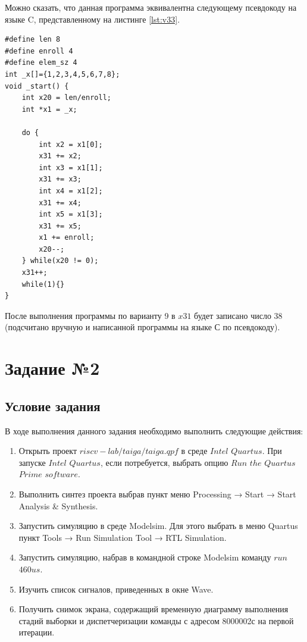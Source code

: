 \clearpage
Можно сказать, что данная программа эквивалентна следующему псевдокоду на языке C, представленному на листинге \ref{lst:v33}.

\begin{lstlisting}[label=lst:v33,caption=Псевдокод программы 9 варианта]
#define len 8
#define enroll 4
#define elem_sz 4
int _x[]={1,2,3,4,5,6,7,8};
void _start() {
	int x20 = len/enroll;
	int *x1 = _x;
	
	do {
		int x2 = x1[0];
		x31 += x2;
		int x3 = x1[1];
		x31 += x3;
		int x4 = x1[2];
		x31 += x4;
		int x5 = x1[3];
		x31 += x5;
		x1 += enroll;
		x20--;
	} while(x20 != 0);
	x31++;
	while(1){}
}
\end{lstlisting}

После выполнения программы по варианту 9 в $x31$ будет записано \newline число 38 (подсчитано вручную и написанной программы на языке С по псевдокоду).

\clearpage

\section{Задание №2}

\subsection*{Условие задания}
В ходе выполнения данного задания необходимо выполнить следующие действия:
\begin{enumerate}
	\item Открыть проект $riscv-lab/taiga/taiga.qpf$ в среде $Intel$ $Quartus$. При запуске $Intel$ $Quartus$, если потребуется, выбрать опцию $Run$ $the$ $Quartus$ $Prime$ $software$.
	\item Выполнить синтез проекта выбрав пункт меню Processing → Start → Start Analysis \& Synthesis.
	\item Запустить симуляцию в среде Modelsim. Для этого выбрать в меню Quartus пункт Tools → Run Simulation Tool → RTL Simulation.
	\item Запустить симуляцию, набрав в командной строке Modelsim команду $run$ $460us$.
	\item Изучить список сигналов, приведенных в окне Wave.
	\item Получить снимок экрана, содержащий временную диаграмму выполнения стадий выборки и диспетчеризации команды с адресом 8000002с на первой итерации.
\end{enumerate}

